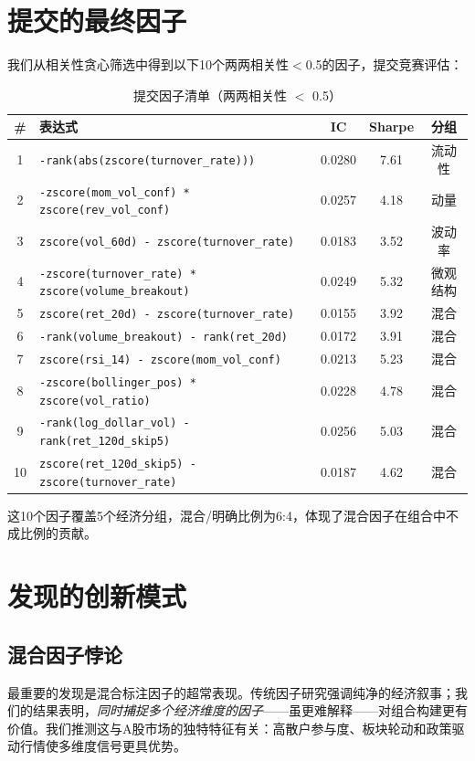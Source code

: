 \documentclass[11pt,a4paper]{ctexart}
\begin{document}
\section{提交的最终因子}

我们从相关性贪心筛选中得到以下10个两两相关性$<$0.5的因子，提交竞赛评估：

\begin{table}[H]
\centering
\caption{提交因子清单（两两相关性 $<$ 0.5）}
\label{tab:submitted}
\scriptsize
\begin{tabular}{clccc}
\toprule
\textbf{\#} & \textbf{表达式} & \textbf{IC} & \textbf{Sharpe} & \textbf{分组} \\
\midrule
1 & \texttt{-rank(abs(zscore(turnover\_rate)))} & 0.0280 & 7.61 & 流动性 \\
2 & \texttt{-zscore(mom\_vol\_conf) * zscore(rev\_vol\_conf)} & 0.0257 & 4.18 & 动量 \\
3 & \texttt{zscore(vol\_60d) - zscore(turnover\_rate)} & 0.0183 & 3.52 & 波动率 \\
4 & \texttt{-zscore(turnover\_rate) * zscore(volume\_breakout)} & 0.0249 & 5.32 & 微观结构 \\
5 & \texttt{zscore(ret\_20d) - zscore(turnover\_rate)} & 0.0155 & 3.92 & 混合 \\
6 & \texttt{-rank(volume\_breakout) - rank(ret\_20d)} & 0.0172 & 3.91 & 混合 \\
7 & \texttt{zscore(rsi\_14) - zscore(mom\_vol\_conf)} & 0.0213 & 5.23 & 混合 \\
8 & \texttt{-zscore(bollinger\_pos) * zscore(vol\_ratio)} & 0.0228 & 4.78 & 混合 \\
9 & \texttt{-rank(log\_dollar\_vol) - rank(ret\_120d\_skip5)} & 0.0256 & 5.03 & 混合 \\
10& \texttt{zscore(ret\_120d\_skip5) - zscore(turnover\_rate)} & 0.0187 & 4.62 & 混合 \\
\bottomrule
\end{tabular}
\end{table}

这10个因子覆盖5个经济分组，混合/明确比例为6:4，体现了混合因子在组合中不成比例的贡献。

\section{发现的创新模式}

\subsection{混合因子悖论}
最重要的发现是混合标注因子的超常表现。传统因子研究强调纯净的经济叙事；我们的结果表明，\textit{同时捕捉多个经济维度的因子}——虽更难解释——对组合构建更有价值。我们推测这与A股市场的独特特征有关：高散户参与度、板块轮动和政策驱动行情使多维度信号更具优势。
\end{document}
